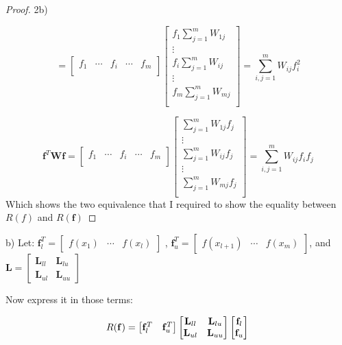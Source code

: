 \documentclass[12pt]{report}
\begin{document}
\begin{proof}
2b)


$$
=
\begin{bmatrix}
f_1& \cdots & f_i & \cdots & f_m\\
\end{bmatrix} 
%
\begin{bmatrix}
f_1 \sum_{j=1}^{m}W_{1j} \\ 
\vdots \\
f_i \sum_{j=1}^{m}W_{ij}\\
\vdots \\
f_m \sum_{j=1}^{m}W_{mj}\\
\end{bmatrix}
=
\sum^m_{i,j=1} W_{ij}f_i^2
$$


$$
\mathbf{f}^T\mathbf{W}\mathbf{f} = 
\begin{bmatrix}
f_1& \cdots & f_i & \cdots & f_m\\
\end{bmatrix} 
%
\begin{bmatrix}
\sum_{j=1}^{m}W_{1j}f_j \\ 
\vdots \\
\sum_{j=1}^{m}W_{ij}f_j\\
\vdots \\
\sum_{j=1}^{m}W_{mj}f_j\\
\end{bmatrix}
=
\sum^m_{i,j=1}W_{ij}f_if_j
$$
Which shows the two equivalence that I required to show the equality between $R(f)$ and $R(\mathbf{f})$
\end{proof}

b)
Let:
$ \mathbf{f}^T_l = \begin{bmatrix}  f(x_1) & \cdots & f(x_l)  \end{bmatrix} $  ,  $ \mathbf{f}^T_u = \begin{bmatrix}  f(x_{l+1}) & \cdots & f(x_m)  \end{bmatrix}  $, and 
$\mathbf{L} = \begin{bmatrix}
\mathbf{L}_{ll}  & \mathbf{L}_{lu} \\
\mathbf{L}_{ul} & \mathbf{L}_{uu}
\end{bmatrix}$

Now express it in those terms:

\begin{equation*}
R(\mathbf{f}) = 
\begin{bmatrix}  \mathbf{f}^T_l  &  \mathbf{f}^T_u  \end{bmatrix} 
\begin{bmatrix}
\mathbf{L}_{ll}  & \mathbf{L}_{lu} \\
\mathbf{L}_{ul} & \mathbf{L}_{uu}
\end{bmatrix}
\begin{bmatrix}
\mathbf{f}_l  \\
\mathbf{f}_u  
\end{bmatrix} \\
\end{equation*}
\end{document}
